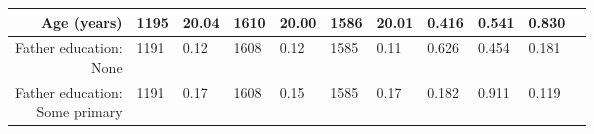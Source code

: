 \begin{longtable}{|r|l|l|l|l|l|l|l|l|l|l}
\hline

	 Age (years)                                                        & 1195                                                               & 20.04                                                              & 1610                                                               & 20.00                                                              & 1586                                                               & 20.01                                                              & 0.416                                                              & 0.541                                                              & 0.830                                                             \\

\hline

	 \makecell{Father education: \\ None}                                             & 1191                                                               &  0.12                                                              & 1608                                                               &  0.12                                                              & 1585                                                               &  0.11                                                              & 0.626                                                              & 0.454                                                              & 0.181                                                             \\

\hline

	 \makecell{Father education: \\ Some primary}                                     & 1191                                                               &  0.17                                                              & 1608                                                               &  0.15                                                              & 1585                                                               &  0.17                                                              & 0.182                                                              & 0.911                                                              & 0.119                                                             \\

\hline


\end{longtable}
